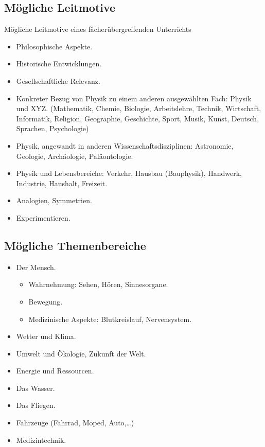 \subsection{M\"{o}gliche Leitmotive}
M\"{o}gliche Leitmotive eines f\"{a}cher\"{u}bergreifenden Unterrichts
\begin{itemize}
\setlength{\itemsep}{0mm}
\item
Philosophische Aspekte.
\item
Historische Entwicklungen.
\item
Gesellschaftliche Relevanz.
\item
Konkreter Bezug von Physik zu einem anderen ausgew\"{a}hlten Fach: Physik und XYZ.
(Mathematik, Chemie, Biologie, Arbeitslehre, Technik, Wirtschaft,
Informatik, Religion, Geographie, Geschichte, Sport, Musik,
Kunst, Deutsch, Sprachen, Psychologie)
\item
Physik, angewandt in anderen Wissenschaftsdisziplinen:
Astronomie, Geologie, Arch\"{a}ologie, Pal\"{a}ontologie.
\item
Physik und Lebensbereiche:
Verkehr, Hausbau (Bauphysik), Handwerk,
Industrie, Haushalt, Freizeit.
\item
Analogien, Symmetrien.
\item
Experimentieren.
\end{itemize}

\subsection{M\"{o}gliche Themenbereiche}
\begin{itemize}
\setlength{\itemsep}{0mm}
\item Der Mensch.
\begin{itemize}
\setlength{\itemsep}{0mm}
\item
Wahrnehmung: Sehen, H\"{o}ren, Sinnesorgane.
\item
Bewegung.
\item
Medizinische Aspekte: Blutkreislauf, Nervensystem.
\end{itemize}
\end{itemize}
\begin{itemize}
\item Wetter und Klima.
\item Umwelt und \"{O}kologie, Zukunft der Welt.
\item Energie und Ressourcen.
\item Das Wasser.
\item Das Fliegen.
\item Fahrzeuge (Fahrrad, Moped, Auto,\dots)
\item Medizintechnik.
\end{itemize}




